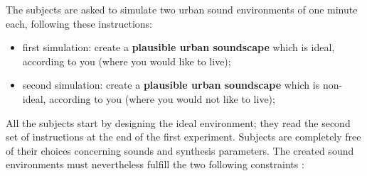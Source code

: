 \documentclass[12pt]{elsarticle}
\begin{document}

The subjects are asked to simulate two urban sound environments of one minute each, following these instructions:


\begin{itemize}
\item  first simulation: create a \textbf{plausible urban soundscape} which is ideal, according to you (where you would like to live);
\item second simulation: create a \textbf{plausible urban soundscape} which is non-ideal, according to you (where you would not like to live);
\end{itemize}



All the subjects start by designing the ideal environment; they read the second set of instructions at the end of the first experiment. Subjects are completely free of their choices concerning sounds and synthesis parameters. The created sound environments must nevertheless fulfill the two following constraints :

\end{document}
